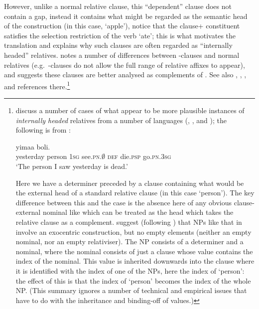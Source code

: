 \documentclass[output=paper
 	        ,biblatex
                ,babelshorthands
                ,newtxmath
                ,draftmode
                ,colorlinks, citecolor=brown
]{langscibook}
\begin{document}
However, unlike a normal relative clause, this ``dependent'' clause does not contain a gap,
instead it contains what might be regarded as the semantic head of the construction (in
this case,  `apple'), notice that the clause+ constituent satisfies
the selection restriction of the verb  `ate'; this is what motivates the
translation and explains why such clauses are often regarded as ``internally headed''
relatives.  \citet[303--317]{Kim16SyntacticStrKorean} notes a number of differences
between -clauses and normal relatives (e.g.\ -clauses do not allow the
full range of relative affixes to appear), and suggests these clauses are better analysed
as complements of . See also , , , and
references there.\footnote{\citet[232--236]{Pollard:Sag:94} discuss a number of cases of what
  appear to be more plausible instances of \emph{internally headed} relatives from a number of
  languages (, , and ); the following is from :%
\begin{exe}\ex\label{x:rc-135}
  \gll [ya indɛ mi wɛ gɔ]  yimaa   boli.\\
       \hphantom{[}yesterday person \textsc{1sg} see.\textsc{pn.$\emptyset$} \textsc{def} die.\textsc{psp} go.\textsc{pn.3sg}\\
  \glt `The person I saw yesterday is dead.' 
\end{exe}
Here we have a determiner  preceded by a clause containing what would be
the external head of a standard relative clause (in this case  `person'). The key
difference between this and the  case is the absence here of any obvious clause-external
nominal like  which can be treated as the head which takes the relative
clause as a complement.  \citet[234]{Pollard:Sag:94} suggest (following \citealt{Culy:90}) that NPs
like that in  involve an exocentric construction, but no empty elements
(neither an empty nominal, nor an empty relativiser). The NP consists of a determiner and
a nominal, where the nominal consists of just a clause whose  value contains
the index of the nominal. This  value is inherited downwards into the clause where it
is identified with the index of one of the NPs, here the index of 
`person': the effect of this is that the index of  `person' becomes
the index of the whole NP. (This summary ignores a number of technical and empirical issues that
have to do
with the inheritance and binding-off of  values.)
}
\end{document}
